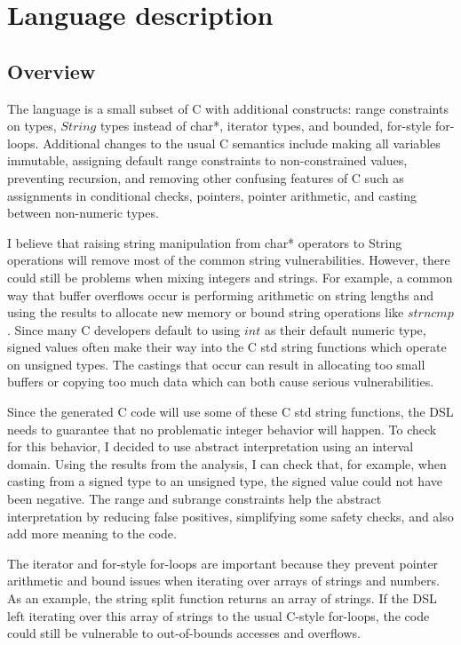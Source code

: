\documentclass[letterpaper]{article}
\begin{document}
\section{Language description}
\label{sec:language}


\subsection{Overview}

The language is a small subset of C with
additional constructs: range constraints on types, $String$ types instead
of char*, iterator types, and bounded, for-style for-loops. Additional changes
to the usual C semantics include making all variables immutable, assigning
default range constraints to non-constrained values, preventing recursion,
and removing  other confusing features of C such as assignments in conditional
checks, pointers, pointer arithmetic, and casting between non-numeric types.

I believe that raising string manipulation from char* operators to String
operations will remove most of the common string vulnerabilities. However,
there could still be problems when mixing integers and strings. For example,
a common way that buffer overflows occur is performing arithmetic on string
lengths and using the results to allocate new memory or bound string operations
like $strncmp$. Since many C developers default to using $int$ as their default
numeric type, signed values often make their way into the C std string functions
which operate on unsigned types. The castings that occur can result in allocating
too small buffers or copying too much data which can both cause serious vulnerabilities.

Since the generated C code will use some of these C std string functions, the DSL
needs to guarantee that no problematic integer behavior will happen. To check for
this behavior, I decided to use abstract interpretation using an interval domain.
Using the results from the analysis, I can check that, for example, when casting
from a signed type to an unsigned type, the signed value could not have been negative.
The range and subrange constraints help the abstract interpretation by reducing false
positives, simplifying some safety checks, and also add more meaning to the code.

The iterator and for-style for-loops are important because they prevent pointer
arithmetic and bound issues when iterating over arrays of strings and numbers.
As an example, the string split function returns an array of strings. If the DSL
left iterating over this array of strings to the usual C-style for-loops, the
code could still be vulnerable to out-of-bounds accesses and overflows. 
\end{document}
